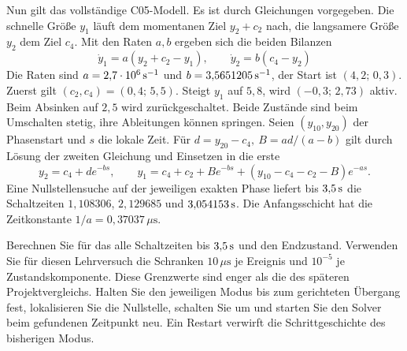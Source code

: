 Nun gilt das vollständige C05-Modell. Es ist durch Gleichungen vorgegeben. Die schnelle Größe \(y_1\) läuft dem momentanen Ziel \(y_2+c_2\) nach, die langsamere Größe \(y_2\) dem Ziel \(c_4\). Mit den Raten \(a,b\) ergeben sich die beiden Bilanzen
\[
 \dot y_1=a(y_2+c_2-y_1),\qquad \dot y_2=b(c_4-y_2)
\]
Die Raten sind \(a=2{,}7\cdot10^6\,\mathrm{s^{-1}}\) und \(b=3{,}5651205\,\mathrm{s^{-1}}\), der Start ist \((4{,}2;\,0{,}3)\). Zuerst gilt \((c_2,c_4)=(0{,}4;\,5{,}5)\). Steigt \(y_1\) auf \(5{,}8\), wird \((-0{,}3;\,2{,}73)\) aktiv. Beim Absinken auf \(2{,}5\) wird zurückgeschaltet. Beide Zustände sind beim Umschalten stetig, ihre Ableitungen können springen.
Seien \((y_{10},y_{20})\) der Phasenstart und \(s\) die lokale Zeit. Für \(d=y_{20}-c_4,\ B=ad/(a-b)\) gilt durch Lösung der zweiten Gleichung und Einsetzen in die erste
\[
 y_2=c_4+d e^{-bs},\qquad
 y_1=c_4+c_2+B e^{-bs}+(y_{10}-c_4-c_2-B)e^{-as}.
\]
Eine Nullstellensuche auf der jeweiligen exakten Phase liefert bis \(3{,}5\,\mathrm{s}\) die Schaltzeiten \(1{,}108306\), \(2{,}129685\) und \(3{,}054153\,\mathrm{s}\). Die Anfangsschicht hat die Zeitkonstante \(1/a=0{,}37037\,\mu\mathrm s\).

Berechnen Sie für das  alle Schaltzeiten bis \(3{,}5\,\mathrm{s}\) und den Endzustand. Verwenden Sie für diesen Lehrversuch die Schranken \(10\,\mu\mathrm s\) je Ereignis und \(10^{-5}\) je Zustandskomponente. Diese Grenzwerte sind enger als die des späteren Projektvergleichs. Halten Sie den jeweiligen Modus bis zum gerichteten Übergang fest, lokalisieren Sie die Nullstelle, schalten Sie um und starten Sie den Solver beim gefundenen Zeitpunkt neu. Ein Restart verwirft die Schrittgeschichte des bisherigen Modus.

